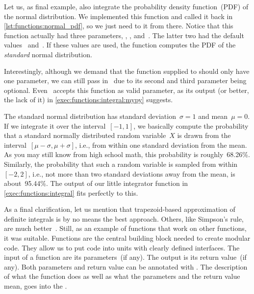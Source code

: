 Let us, as final example, also integrate the probability density function~(PDF) of the normal distribution.
We implemented this function and called it  back in \cref{lst:functions:normal_pdf}, so we just need to  it from there.
Notice that this function actually had three parameters, , , and~.
The latter two had the default values~ and~.
If these values are used, the function computes the PDF of the \emph{standard} normal distribution.


Interestingly, although we demand that the function supplied to  should only have one parameter, we can still pass in~ due to its second and third parameter being optional.
Even \mypy\ accepts this function as valid parameter, as its output (or better, the lack of it) in \cref{exec:functions:integral:mypy} suggests.

The standard normal distribution has standard deviation~$\sigma=1$ and mean~$\mu=0$.
If we integrate it over the interval~$[-1,1]$, we basically compute the probability that a standard normally distributed random variable~$X$ is drawn from the interval~$[\mu-\sigma,\mu+\sigma]$, i.e., from within one standard deviation from the mean.
As you may still know from high school math, this probability is roughly~68.26\%.
Similarly, the probability that such a random variable is sampled from within~$[-2,2]$, i.e., not more than two standard deviations away from the mean, is about~95.44\%.
The output of our little integrator function in \cref{exec:functions:integral} fits perfectly to this.

As a final clarification, let us mention that trapezoid-based approximation of definite integrals is by no means the best approach.
Others, like Simpson's rule, are much better~\cite{E2013AITNMAA}.
Still, as an example of functions that work on other functions, it was suitable.%
\FloatBarrier%
\endhsection%
%
%
Functions are the central building block needed to create modular code.
They allow us to put code into units with clearly defined interfaces.
The input of a function are its parameters~(if any).
The output is its return value~(if any).
Both parameters and return value can be annotated with .
The description of what the function does as well as what the parameters and the return value mean, goes into the .

